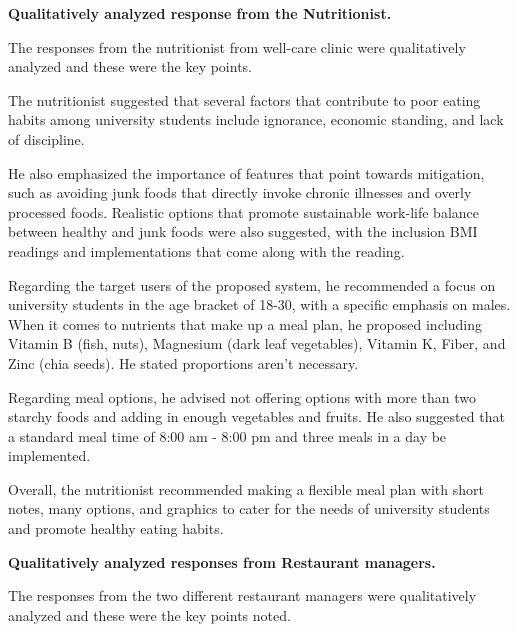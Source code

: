 \documentclass{article}
\begin{document}
\newpage
\noindent
\textbf{Qualitatively analyzed response from the Nutritionist.}

\noindent The responses from the nutritionist from well-care clinic were qualitatively analyzed and these were the key points.
\vspace{10pt}

\noindent The nutritionist suggested that several factors that contribute to poor eating habits among university students include ignorance, economic standing, and lack of discipline.

\vspace{10pt}

\noindent He also emphasized the importance of features that point towards mitigation, such as avoiding junk foods that directly invoke chronic illnesses and overly processed foods. Realistic options that promote sustainable work-life balance between healthy and junk foods were also suggested, with the inclusion  BMI readings and implementations that come along with the reading.

\vspace{10pt}

\noindent Regarding the target users of the proposed system, he recommended a focus on university students in the age bracket of 18-30, with a specific emphasis on males. When it comes to nutrients that make up a meal plan, he proposed including Vitamin B (fish, nuts), Magnesium (dark leaf vegetables), Vitamin K, Fiber, and Zinc (chia seeds). He stated proportions aren't necessary.

\vspace{10pt}

\noindent Regarding meal options, he advised not offering options with more than two starchy foods and adding in enough vegetables and fruits. He also suggested that a standard meal time of 8:00 am - 8:00 pm and three meals in a day be implemented.

\vspace{10pt}

\noindent Overall, the nutritionist recommended making a flexible meal plan with short notes, many options, and graphics to cater for the needs of university students and promote healthy eating habits.

\vspace{40pt}

\noindent
\textbf{Qualitatively analyzed responses from Restaurant managers.}

\noindent
The responses from the two different restaurant managers were qualitatively analyzed and these were the key points noted.
\vspace{10pt}
\end{document}
